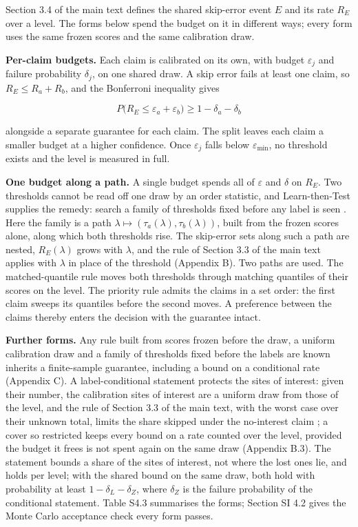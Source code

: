 \documentclass{iopjournal}
\begin{document}
Section 3.4 of the main text defines the shared skip-error event \(E\) and its rate \(R_E\) over a level. The forms below spend the budget on it in different ways; every form uses the same frozen scores and the same calibration draw.

\textbf{Per-claim budgets.} Each claim is calibrated on its own, with budget \(\varepsilon_j\) and failure probability \(\delta_j\), on one shared draw. A skip error fails at least one claim, so \(R_E \le R_a + R_b\), and the Bonferroni inequality gives

\[
P\big(R_E \le \varepsilon_a + \varepsilon_b\big) \ge 1 - \delta_a - \delta_b
\]

alongside a separate guarantee for each claim. The split leaves each claim a smaller budget at a higher confidence. Once \(\varepsilon_j\) falls below \(\varepsilon_{\min}\), no threshold exists and the level is measured in full.

\textbf{One budget along a path.} A single budget spends all of \(\varepsilon\) and \(\delta\) on \(R_E\). Two thresholds cannot be read off one draw by an order statistic, and Learn-then-Test supplies the remedy: search a family of thresholds fixed before any label is seen \cite{Angelopoulos2025}. Here the family is a path \(\lambda \mapsto (\tau_a(\lambda), \tau_b(\lambda))\), built from the frozen scores alone, along which both thresholds rise. The skip-error sets along such a path are nested, \(R_E(\lambda)\) grows with \(\lambda\), and the rule of Section 3.3 of the main text applies with \(\lambda\) in place of the threshold (Appendix B). Two paths are used. The matched-quantile rule moves both thresholds through matching quantiles of their scores on the level. The priority rule admits the claims in a set order: the first claim sweeps its quantiles before the second moves. A preference between the claims thereby enters the decision with the guarantee intact.

\textbf{Further forms.} Any rule built from scores frozen before the draw, a uniform calibration draw and a family of thresholds fixed before the labels are known inherits a finite-sample guarantee, including a bound on a conditional rate (Appendix C). A label-conditional statement protects the sites of interest: given their number, the calibration sites of interest are a uniform draw from those of the level, and the rule of Section 3.3 of the main text, with the worst case over their unknown total, limits the share skipped under the no-interest claim \cite{Vovk2005,Sadinle2019,Tong2018}; a cover so restricted keeps every bound on a rate counted over the level, provided the budget it frees is not spent again on the same draw (Appendix B.3). The statement bounds a share of the sites of interest, not where the lost ones lie, and holds per level; with the shared bound on the same draw, both hold with probability at least \(1 - \delta_L - \delta_Z\), where \(\delta_Z\) is the failure probability of the conditional statement. Table S4.3 summarises the forms; Section SI 4.2 gives the Monte Carlo acceptance check every form passes.
\end{document}
